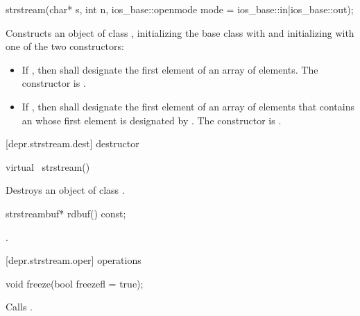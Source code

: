 %
\begin{itemdecl}
strstream(char* s, int n,
          ios_base::openmode mode = ios_base::in|ios_base::out);
\end{itemdecl}

\begin{itemdescr}
\pnum
\effects
Constructs an object of class
,
initializing the base class with
and initializing  with one of the two constructors:
\begin{itemize}
\item
If
,
then  shall designate the first element of an array of  elements.
The constructor is
.
\item
If
,
then  shall
designate the first element of an array of  elements that contains
an \ntbs whose first element is designated by .
The constructor is
.
%
\end{itemize}
\end{itemdescr}

[depr.strstream.dest]{ destructor}

%
\begin{itemdecl}
virtual ~strstream()
\end{itemdecl}

\begin{itemdescr}
\pnum
\effects
Destroys an object of class
.
\end{itemdescr}

%
\begin{itemdecl}
strstreambuf* rdbuf() const;
\end{itemdecl}

\begin{itemdescr}
\pnum
\returns
{}.
\end{itemdescr}

[depr.strstream.oper]{ operations}

%
\begin{itemdecl}
void freeze(bool freezefl = true);
\end{itemdecl}

\begin{itemdescr}
\pnum
\effects
Calls
.
\end{itemdescr}


